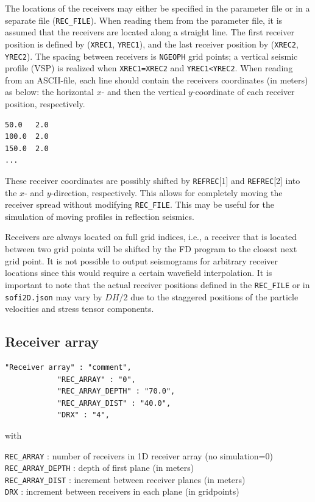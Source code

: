The locations of the receivers may either be specified in the parameter file or in a separate file (\texttt{REC\_FILE}). When reading them from the parameter file, it is assumed that the receivers are located along a straight line. The first receiver position is defined by (\texttt{XREC1}, \texttt{YREC1}), and the last receiver position by (\texttt{XREC2}, \texttt{YREC2}). The spacing between receivers is \texttt{NGEOPH} grid points; a vertical seismic profile (VSP) is realized when \texttt{XREC1=XREC2} and \texttt{YREC1<YREC2}. When reading from an ASCII-file, each line should contain the receivers coordinates (in meters) as below: the horizontal $x$- and then the vertical $y$-coordinate of each receiver position, respectively.
\begin{verbatim}
50.0   2.0
100.0  2.0
150.0  2.0
...
\end{verbatim}

These receiver coordinates are possibly shifted by \texttt{REFREC}[1] and \texttt{REFREC}[2] into the $x$- and $y$-direction, respectively. This allows for completely moving the receiver spread without modifying \texttt{REC\_FILE}. This may be useful for the simulation of moving profiles in reflection seismics.

Receivers are always located on full grid indices, i.e., a receiver that is located between two grid points will be shifted by the FD program to the closest next grid point. It is not possible to output seismograms for arbitrary receiver locations since this would require a certain wavefield interpolation. It is important to note that the actual receiver positions defined in the \texttt{REC\_FILE} or in \texttt{sofi2D.json} may vary by $DH/2$ due to the staggered positions of the particle velocities and stress tensor components.

\subsection{Receiver array}
\begin{verbatim}
"Receiver array" : "comment",
            "REC_ARRAY" : "0",
            "REC_ARRAY_DEPTH" : "70.0",
            "REC_ARRAY_DIST" : "40.0", 
            "DRX" : "4",
\end{verbatim}

with

\texttt{REC\_ARRAY} : number of receivers in 1D receiver array (no simulation=0)\\
\texttt{REC\_ARRAY\_DEPTH} : depth of first plane (in meters)\\
\texttt{REC\_ARRAY\_DIST} : increment between receiver planes (in meters)\\
\texttt{DRX} : increment between receivers in each plane (in gridpoints)

